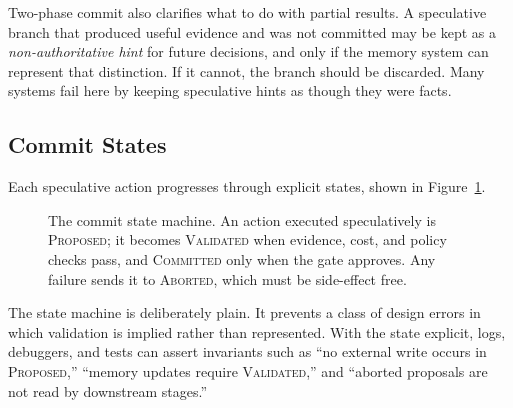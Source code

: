 \documentclass[11pt]{book}
\begin{document}
Two-phase commit also clarifies what to do with partial results. A speculative branch that produced useful evidence and was not committed may be kept as a \textit{non-authoritative hint} for future decisions, and only if the memory system can represent that distinction. If it cannot, the branch should be discarded. Many systems fail here by keeping speculative hints as though they were facts.

\subsection{Commit States}

Each speculative action progresses through explicit states, shown in Figure~\ref{fig:commit-states}.

\begin{figure}[htbp]
\centering
{}
\caption{The commit state machine. An action executed speculatively is \textsc{Proposed}; it becomes \textsc{Validated} when evidence, cost, and policy checks pass, and \textsc{Committed} only when the gate approves. Any failure sends it to \textsc{Aborted}, which must be side-effect free.}
\label{fig:commit-states}
\end{figure}

The state machine is deliberately plain. It prevents a class of design errors in which validation is implied rather than represented. With the state explicit, logs, debuggers, and tests can assert invariants such as ``no external write occurs in \textsc{Proposed},'' ``memory updates require \textsc{Validated},'' and ``aborted proposals are not read by downstream stages.''
\end{document}
